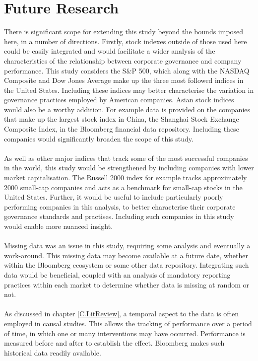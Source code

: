 \section{Future Research}
{There is significant scope for extending this study beyond the bounds imposed here, in a number of directions. Firstly, stock indexes outside of those used here could be easily integrated and would facilitate a wider analysis of the characteristics of the relationship between corporate governance and company performance. This study considers the S\&P 500, which along with the NASDAQ Composite and Dow Jones Average make up the three most followed indices in the United States. Including these indices may better characterise the variation in governance practices employed by American companies. Asian stock indices would also be a worthy addition. For example data is provided on the companies that make up the largest stock index in China, the Shanghai Stock Exchange Composite Index, in the Bloomberg financial data repository. Including these companies would significantly broaden the scope of this study.  \\\\
As well as other major indices that track some of the most successful companies in the world, this study would be strengthened by including companies with lower market capitalisation. The Russell 2000 index for example tracks approximately 2000 small-cap companies and acts as a benchmark for small-cap stocks in the United States. Further, it would be useful to include particularly poorly performing companies in this analysis, to better characterise their corporate governance standards and practises.   Including such companies in this study would enable more nuanced insight.   \\\\
Missing data was an issue in this study, requiring some analysis and eventually a work-around. This missing data may become available at a future date, whether within the Bloomberg ecosystem or some other data repository. Integrating such data would be beneficial, coupled with an analysis of mandatory reporting practices within each market to determine whether data is missing at random or not. \\\\
As discussed in chapter \ref{C.LitReview}, a temporal aspect to the data is often employed in causal studies. This allows the tracking of performance over a period of time, in which one or many interventions may have occurred. Performance is measured before and after to establish the effect. Bloomberg makes such historical data readily available.\\\\
}
